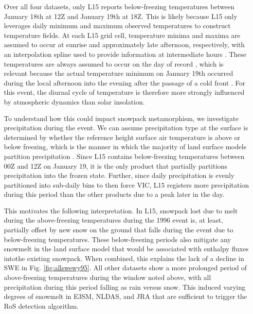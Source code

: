 \documentclass[nhess, manuscript]{copernicus}
\begin{document}
Over all four datasets, only L15 reports below-freezing temperatures between January 18th at 12Z and January 19th at 18Z. 
This is likely because L15 only leverages daily minimum and maximum observed temperatures to construct temperature fields. 
At each L15 grid cell, temperature minima and maxima are assumed to occur at sunrise and approximately late afternoon, respectively, with an interpolation spline used to provide information at intermediate hours \citep{bohn2013global}. 
These temperatures are always assumed to occur on the day of record \citep{livneh2015spatially}, which is relevant because the actual temperature minimum on January 19th occurred during the local afternoon into the evening after the passage of a cold front \citep{leathers1998severe}. 
For this event, the diurnal cycle of temperature is therefore more strongly influenced by atmospheric dynamics than solar insolation.

To understand how this could impact snowpack metamorphism, we investigate precipitation during the event. 
We can assume precipitation type at the surface is determined by whether the reference height surface air temperature is above or below freezing, which is the manner in which the majority of land surface models partition precipitation \citep{harpold2017rain,jennings2018spatial,Woodburn2021}. 
Since L15 contains below-freezing temperatures between 00Z and 12Z on January 19, it is the only product that partially partitions precipitation into the frozen state. 
Further, since daily precipitation is evenly partitioned into sub-daily bins to then force VIC, L15 registers more precipitation during this period than the other products due to a peak later in the day.

This motivates the following interpretation. 
In L15, snowpack lost due to melt during the above-freezing temperatures during the 1996 event is, at least, partially offset by new snow on the ground that falls during the event due to below-freezing temperatures. 
These below-freezing periods also mitigate any snowmelt in the land surface model that would be associated with enthalpy fluxes intothe existing snowpack. 
When combined, this explains the lack of a decline in SWE in Fig. \ref{fig:allswewy95}. 
All other datasets show a more prolonged period of above-freezing temperatures during the window noted above, with all precipitation during this period falling as rain versus snow. 
This induced varying degrees of snowmelt in E3SM, NLDAS, and JRA that are sufficient to trigger the RoS detection algorithm.
\end{document}
